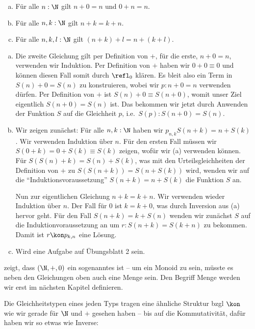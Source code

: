 \begin{lemma}
\label{nat-wild-monoid}
\begin{enumerate}[(a)]
\item Für alle $n:\N$ gilt $n+0=n$ und $0+n=n$.
\item Für alle $n,k:\N$ gilt $n+k=k+n$.
\item Für alle $n,k,l:\N$ gilt $(n+k)+l=n+(k+l)$.
\end{enumerate}
\end{lemma}
\begin{beweis}
\begin{enumerate}[(a)]
\item Die zweite Gleichung gilt per Definition von $+$,
  für die erste, $n+0=n$, verwenden wir Induktion.
  Per Definition von $+$ haben wir $0+0\equiv 0$ und können diesen Fall somit durch $\refl_0$ klären.
  Es bleit also ein Term in $S(n)+0=S(n)$ zu konstruieren, wobei wir $ p:n+0=n$ verwenden dürfen.
  Per Definition von $+$ ist $S(n)+0\equiv S(n+0)$, womit unser Ziel eigentlich $S(n+0)=S(n)$ ist.
  Das bekommen wir jetzt durch Anwenden der Funktion $S$ auf die Gleichheit $ p$, i.e.\ $S( p):S(n+0)=S(n)$.
\item Wir zeigen zunächst: Für alle $n,k:\N$ haben wir $ p_{n,k}S(n+k)=n+S(k)$.
  Wir verwenden Induktion über $n$.
  Für den ersten Fall müssen wir $S(0+k)=0+S(k)\equiv S(k)$ zeigen, wofür wir (a) verwenden können.
  Für $S(S(n)+k)=S(n)+S(k)$,
  was mit den Urteilsgleichheiten der Definition von $+$ zu $S(S(n+k))=S(n+S(k))$ wird,
  wenden wir auf die ``Induktionsvoraussetzung'' $S(n+k)=n+S(k)$ die Funktion $S$ an.

  Nun zur eigentlichen Gleichung $n+k=k+n$.
  Wir verwenden wieder Induktion über $n$.
  Der Fall für $0$ ist $k=k+0$, was durch Inversion aus (a) hervor geht.
  Für den Fall $S(n+k)=k+S(n)$ wenden wir zunächst $S$
  auf die Induktionvoraussetzung an um $ r:S(n+k)=S(k+n)$ zu bekommen.
  Damit ist $ r\kon p_{k,n}$ eine Lösung.
\item Wird eine Aufgabe auf Übungsblatt 2 sein.
\end{enumerate}
\end{beweis}

 zeigt, dass $(\N,+,0)$ ein sogenanntes  ist -- um ein Monoid zu sein, müsste es neben den Gleichungen oben auch eine Menge sein. Den Begriff Menge werden wir erst im nächsten Kapitel definieren.

Die Gleichheitstypen eines jeden Typs tragen eine ähnliche Struktur bzgl $\kon$ wie wir gerade für $\N$ und $+$ gesehen haben -- bis auf die Kommutativität, dafür haben wir so etwas wie Inverse:

